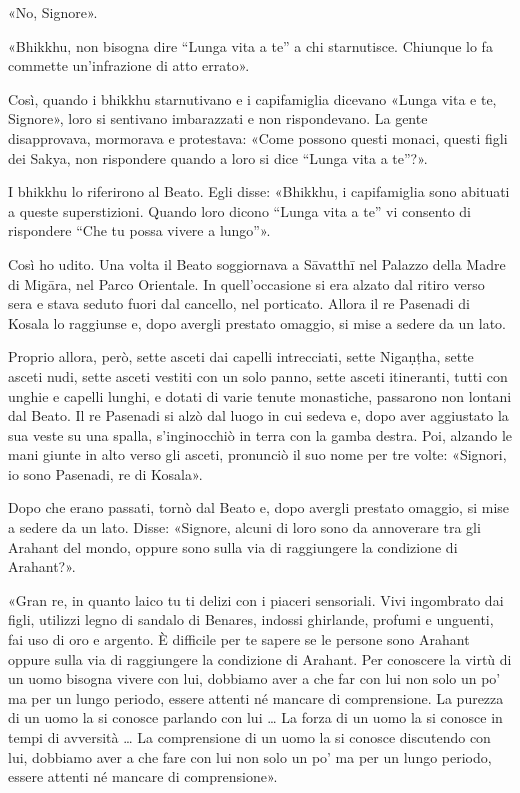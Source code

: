 «No, Signore».


«Bhikkhu, non bisogna dire “Lunga vita a te” a chi starnutisce. Chiunque
lo fa commette un’infrazione di atto errato».


Così, quando i bhikkhu starnutivano e i capifamiglia dicevano «Lunga
vita e te, Signore», loro si sentivano imbarazzati e non rispondevano.
La gente disapprovava, mormorava e protestava: «Come possono questi
monaci, questi figli dei Sakya, non rispondere quando a loro si dice
“Lunga vita a te”?».


I bhikkhu lo riferirono al Beato. Egli disse: «Bhikkhu, i capifamiglia
sono abituati a queste superstizioni. Quando loro dicono “Lunga vita a
te” vi consento di rispondere “Che tu possa vivere a lungo”».




 Così ho udito. Una volta il Beato soggiornava a Sāvatthī nel
Palazzo della Madre di Migāra, nel Parco Orientale. In quell’occasione
si era alzato dal ritiro verso sera e stava seduto fuori dal cancello,
nel porticato. Allora il re Pasenadi di Kosala lo raggiunse e, dopo
avergli prestato omaggio, si mise a sedere da un lato.


Proprio allora, però, sette asceti dai capelli intrecciati, sette
Nigaṇṭha, sette asceti nudi, sette asceti vestiti con un solo panno,
sette asceti itineranti, tutti con unghie e capelli lunghi, e dotati di
varie tenute monastiche, passarono non lontani dal Beato. Il re Pasenadi
si alzò dal luogo in cui sedeva e, dopo aver aggiustato la sua veste su
una spalla, s’inginocchiò in terra con la gamba destra. Poi, alzando le
mani giunte in alto verso gli asceti, pronunciò il suo nome per tre
volte: «Signori, io sono Pasenadi, re di Kosala».


Dopo che erano passati, tornò dal Beato e, dopo avergli prestato
omaggio, si mise a sedere da un lato. Disse: «Signore, alcuni di loro
sono da annoverare tra gli Arahant del mondo, oppure sono sulla via di
raggiungere la condizione di Arahant?».


«Gran re, in quanto laico tu ti delizi con i piaceri sensoriali. Vivi
ingombrato dai figli, utilizzi legno di sandalo di Benares, indossi
ghirlande, profumi e unguenti, fai uso di oro e argento. È difficile per
te sapere se le persone sono Arahant oppure sulla via di raggiungere la
condizione di Arahant. Per conoscere la virtù di un uomo bisogna vivere
con lui, dobbiamo aver a che far con lui non solo un po’ ma per un lungo
periodo, essere attenti né mancare di comprensione. La purezza di un
uomo la si conosce parlando con lui … La forza di un uomo la si conosce
in tempi di avversità … La comprensione di un uomo la si conosce
discutendo con lui, dobbiamo aver a che fare con lui non solo un po’ ma
per un lungo periodo, essere attenti né mancare di comprensione».


